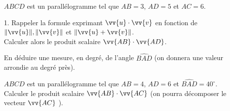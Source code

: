 \documentclass[12pt,a4paper]{article}  %
\begin{document}
\exerciceDS{}
$A B C D$ est un parallélogramme tel que $A B=3$, $A D=5$ et $A C=6$.
\begin{enumMet}
    \item 1. Rappeler la formule exprimant $\vv{u} \cdot \vv{v}$ en fonction de $\|\vv{u}\|,\|\vv{v}\|$ et $\|\vv{u}+\vv{v}\|$.\\
    Calculer alors le produit scalaire $\vv{A B} \cdot \vv{A D}$.
    \item En déduire une mesure, en degré, de l'angle $\widehat{B A D}$ (on donnera une valeur arrondie au degré près).
\end{enumMet}

\exerciceDS{}
$A B C D$ est un parallélogramme tel que $A B=4$, $A D=6$ et $\widehat{B A D}=40^{\circ}$.\\
Calculer le produit scalaire $\vv{A B} \cdot \vv{A C}$ (on pourra décomposer le vecteur $\vv{A C}$ ).
\end{document}
